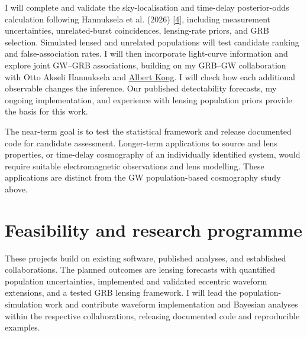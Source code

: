 \documentclass[11pt]{article}
\begin{document}
I will complete and validate the sky-localisation and time-delay posterior-odds calculation following Hannuksela et al. (2026) [\hyperlink{ref4}{4}], including measurement uncertainties, unrelated-burst coincidences, lensing-rate priors, and GRB selection. Simulated lensed and unrelated populations will test candidate ranking and false-association rates. I will then incorporate light-curve information and explore joint GW--GRB associations, building on my GRB--GW collaboration with Otto Akseli Hannuksela and \href{https://iphd.site.nthu.edu.tw/p/406-1222-87294,r5205.php?Lang=en}{Albert Kong}. I will check how each additional observable changes the inference. Our published detectability forecasts, my ongoing implementation, and experience with lensing population priors provide the basis for this work.

The near-term goal is to test the statistical framework and release documented code for candidate assessment. Longer-term applications to source and lens properties, or time-delay cosmography of an individually identified system, would require suitable electromagnetic observations and lens modelling. These applications are distinct from the GW population-based cosmography study above.

\section*{Feasibility and research programme}
These projects build on existing software, published analyses, and established collaborations. The planned outcomes are lensing forecasts with quantified population uncertainties, implemented and validated eccentric waveform extensions, and a tested GRB lensing framework. I will lead the population-simulation work and contribute waveform implementation and Bayesian analyses within the respective collaborations, releasing documented code and reproducible examples.
\end{document}
